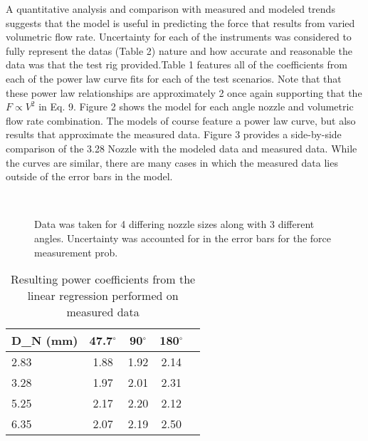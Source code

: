 \documentclass[11pt]{article}
\newcommand{\dgr}{\boldmath\ensuremath{{}^\circ}\unboldmath}
\newcommand{\ra}[1]{\renewcommand{\arraystretch}{#1}}
\begin{document}
A quantitative analysis and comparison with measured and modeled trends suggests that the model is useful in predicting the force that results from varied volumetric flow rate. Uncertainty for each of the instruments was considered to fully represent the datas (Table 2) nature and how accurate and  reasonable the data was that the test rig provided.Table 1 features all of the coefficients from each of the power law curve fits for each of the test scenarios. Note that that these power law relationships are approximately 2 once again supporting that the $F\propto V^2$ in Eq. 9. Figure 2 shows the model for each angle nozzle and volumetric flow rate combination. The models of course feature a power law curve, but also results that approximate the measured data. Figure 3 provides a side-by-side comparison of the 3.28 Nozzle with the modeled data and measured data. While the curves are similar, there are many cases in which the measured data lies outside of the error bars in the model.



 \begin{figure}
   \centering
    \\
   \caption{Data was taken for 4 differing nozzle sizes along with 3 different angles. Uncertainty was accounted for in the error bars for the force measurement prob.
   }
   \label{fig:t49}
\end{figure}

\begin{table}[]
\caption{Resulting power coefficients from the linear regression performed on measured data}
\ra{1.2}
    \centering
    \begin{tabular}{lcccc@{}}\toprule
        D_N (mm) & 47.7\dgr & 90\dgr & 180\dgr \\\midrule
         2.83 & 1.88 & 1.92 & 2.14\\
         3.28 & 1.97& 2.01 & 2.31\\
         5.25 & 2.17& 2.20 & 2.12\\
         6.35 & 2.07& 2.19 & 2.50  \\\bottomrule
    \end{tabular}
    
    \label{tab:my_label}
    \vspace{10pt}
\end{table}
\end{document}

